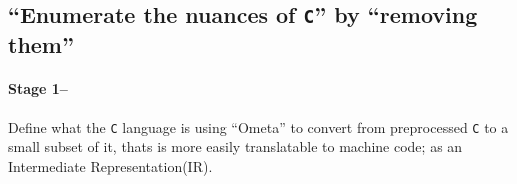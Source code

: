 \hypertarget{enumerate-the-nuances-of-c-by-removing-them}{%
\subsection{\texorpdfstring{``Enumerate the nuances of \texttt{C}'' by
``removing
them''}{``Enumerate the nuances of C'' by ``removing them''}}\label{enumerate-the-nuances-of-c-by-removing-them}}

\hypertarget{stage-1}{%
\paragraph{Stage 1--}\label{stage-1}}

Define what the \texttt{C} language is using ``Ometa'' to convert from
preprocessed \texttt{C} to a small subset of it, thats is more easily
translatable to machine code; as an Intermediate Representation(IR).


